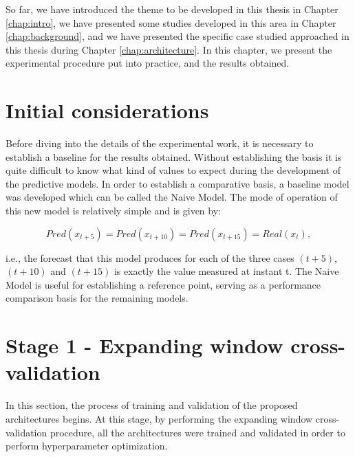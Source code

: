 \cleardoublepage
\label{chap:results}

So far, we have introduced the theme to be developed in this thesis in Chapter \ref{chap:intro}, we have presented some studies developed in this area in Chapter \ref{chap:background}, and we have presented the specific case studied approached in this thesis during Chapter \ref{chap:architecture}. In this chapter, we present the experimental procedure put into practice, and the results obtained.



\section{Initial considerations}

Before diving into the details of the experimental work, it is necessary to establish a baseline for the results obtained. Without establishing the basis it is quite difficult to know what kind of values to expect during the development of the predictive models. In order to establish a comparative basis, a baseline model was developed which can be called the Naive Model. The mode of operation of this new model is relatively simple and is given by:

\begin{equation}
   Pred(x_{t+5}) = Pred(x_{t+10}) = Pred(x_{t+15}) = Real(x_{t}),
   \label{naive}
\end{equation}

i.e., the forecast that this model produces for each of the three cases $(t+5)$, $(t+10)$ and $(t+15)$ is exactly the value measured at instant t. The Naive Model is useful for establishing a reference point, serving as a performance comparison basis for the remaining models.

\section{Stage 1 - Expanding window cross-validation}\label{chap3:section:stage_1}

In this section, the process of training and validation of the proposed architectures begins. At this stage, by performing the expanding window cross-validation procedure, all the architectures were trained and validated in order to perform hyperparameter optimization. 

